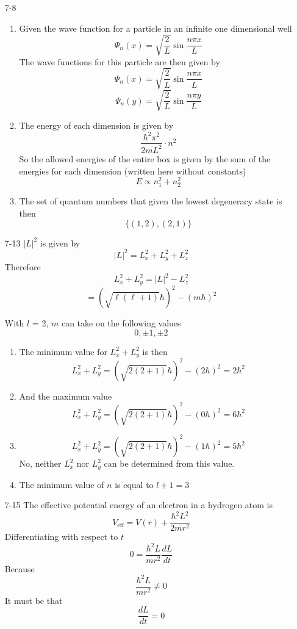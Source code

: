 \documentclass[]{2620hw}
\begin{document}
\begin{enumerate}
\begin{enumerate}
\end{enumerate}

\item [7-8]
\begin{enumerate}
	\item Given the wave function for a particle in an infinite one dimensional well
	\[
		\Psi_n(x)  = \sqrt{ \frac{2}{L} } \sin \frac{n \pi x}{L} 
	\]
	The wave functions for this particle are then given by 
	\[
		\Psi_n(x)  = \sqrt{ \frac{2}{L} } \sin \frac{n \pi x}{L}
	\]
	\[
		\Psi_n(y)  = \sqrt{ \frac{2}{L} } \sin \frac{n \pi y}{L}
	\]
	
	\item 
	The energy of each dimension is given by 
	\[
		\frac{\hbar^2 \pi^2}{2mL^2} \cdot n^2
	\]
	So the allowed energies of the entire box is given by the sum of the energies for each dimension (written here without constants)
	\[
		E \propto n_1^2 + n_2^2 
	\]

	\item The set of quantum numbers that given the lowest degeneracy state is then 
	\[
		\{ (1, 2), (2, 1) \}
	\]

\end{enumerate}

\item [7-13]
	$|L|^2$ is given by 
	\[
		|L|^2 =  L_x^2 + L_y^2 + L_z^2
	\]
	Therefore 	
	\[
		L_x^2 + L_y^2 = |L|^2 - L_z^2 
	\]
	\[
		 = \left(\sqrt{\ell(\ell+1)}\hbar \right )^2  - (m\hbar)^2
	\]
	
	With $l$ = 2, $m$ can take on the following values 
	\[
		0, \pm 1, \pm2
	\]
\begin{enumerate}
	\item The minimum value for $L_x^2 + L_y^2$ is then
	\[
		L_x^2 + L_y^2 = \left(\sqrt{2(2+1)} \hbar\right)^2 - (2\hbar)^2 = 2\hbar^2 
	\]

	\item And the maximum value 
	\[
		L_x^2 + L_y^2 = \left(\sqrt{2(2+1)} \hbar\right)^2 - (0\hbar)^2  = 6\hbar^2 
	\]
	\item 
	\[
		L_x^2 + L_y^2 = \left(\sqrt{2(2+1)} \hbar\right)^2 - (1\hbar)^2  = 5\hbar^2
	\]
	No, neither $L_x^2$ nor $L_y^2$ can be determined from this value. 
	\item The minimum value of $n$ is equal to $l+1 = 3$
\end{enumerate}

\item [7-15]
The effective potential energy of an electron in a hydrogen atom is 
\[
	V_{\text{eff}} = V(r) + \frac{\hbar^2 L^2}{2mr^2}
\]
Differentiating with respect to $t$
\[
	 0 = \frac{\hbar^2 L}{mr^2} \frac{dL}{dt}
\]
Because 
\[
	\frac{\hbar^2 L}{mr^2} \neq 0
\]
It must be that
\[
	\frac{dL}{dt} = 0
\]


\end{enumerate}
\end{document}
